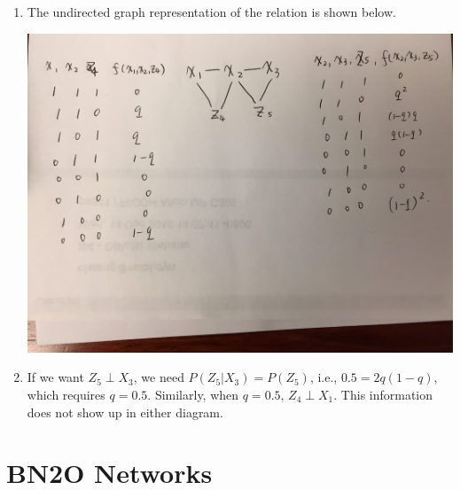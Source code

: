 \documentclass[notitlepage]{article}
\begin{document}
\begin{enumerate}
\item The undirected graph representation of the relation is shown below.

\includegraphics[width=0.5\columnwidth]{undirected.jpg}

\item If we want $Z_5\perp X_3$, we need $P(Z_5|X_3)=P(Z_5)$, i.e., $0.5 = 2q(1-q)$, which requires $q=0.5$.
Similarly, when $q=0.5$, $Z_4\perp X_1$. This information does not show up in either diagram.

\end{enumerate}

\section{BN2O Networks}
\end{document}

